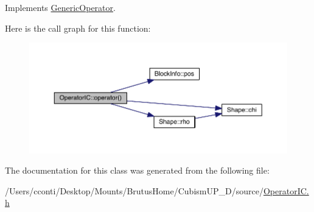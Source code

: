 Implements \hyperlink{class_generic_operator_aacd69e70a1e2d75b97358fca48689a67}{Generic\+Operator}.



Here is the call graph for this function\+:\nopagebreak
\begin{figure}[H]
\begin{center}
\leavevmode
\includegraphics[width=350pt]{de/d4a/class_operator_i_c_adf547defe5168b4bb0181df741a71144_cgraph}
\end{center}
\end{figure}




The documentation for this class was generated from the following file\+:\begin{DoxyCompactItemize}
\item 
/\+Users/cconti/\+Desktop/\+Mounts/\+Brutus\+Home/\+Cubism\+U\+P\+\_\+D/source/\hyperlink{_operator_i_c_8h}{Operator\+I\+C.\+h}\end{DoxyCompactItemize}
